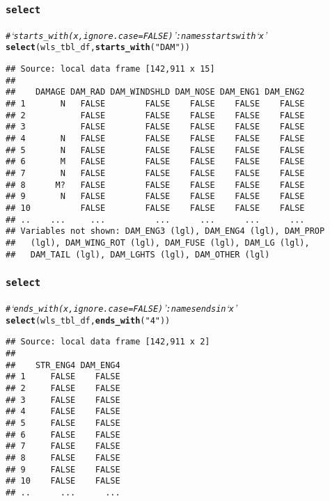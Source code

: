 \documentclass{beamer}\usepackage[]{graphicx}\usepackage[]{color}
\makeatletter
\newcommand{\hlstr}[1]{\textcolor[rgb]{0.192,0.494,0.8}{#1}}%
\newcommand{\hlcom}[1]{\textcolor[rgb]{0.678,0.584,0.686}{\textit{#1}}}%
\newcommand{\hlstd}[1]{\textcolor[rgb]{0.345,0.345,0.345}{#1}}%
\newcommand{\hlkwd}[1]{\textcolor[rgb]{0.737,0.353,0.396}{\textbf{#1}}}%
\newenvironment{kframe}{%
 \def\at@end@of@kframe{}%
 \ifinner\ifhmode%
  \def\at@end@of@kframe{\end{minipage}}%
  \begin{minipage}{\columnwidth}%
 \fi\fi%
 \def\FrameCommand##1{\hskip\@totalleftmargin \hskip-\fboxsep
 \colorbox{shadecolor}{##1}\hskip-\fboxsep
     \hskip-\linewidth \hskip-\@totalleftmargin \hskip\columnwidth}%
 \MakeFramed {\advance\hsize-\width
   \@totalleftmargin\z@ \linewidth\hsize
   \@setminipage}}%
 {\par\unskip\endMakeFramed%
 \at@end@of@kframe}
\newenvironment{knitrout}{}{} %
\makeatother
\begin{document}
\begin{frame}[fragile]
  \frametitle{{\tt select}}
\begin{knitrout}\footnotesize
{}\color{fgcolor}\begin{kframe}
\begin{alltt}
\hlcom{# ‘starts_with(x, ignore.case = FALSE)’: names starts with ‘x’}
\hlkwd{select}\hlstd{(wls_tbl_df,} \hlkwd{starts_with}\hlstd{(}\hlstr{"DAM"}\hlstd{))}
\end{alltt}
\begin{verbatim}
## Source: local data frame [142,911 x 15]
## 
##    DAMAGE DAM_RAD DAM_WINDSHLD DAM_NOSE DAM_ENG1 DAM_ENG2
## 1       N   FALSE        FALSE    FALSE    FALSE    FALSE
## 2           FALSE        FALSE    FALSE    FALSE    FALSE
## 3           FALSE        FALSE    FALSE    FALSE    FALSE
## 4       N   FALSE        FALSE    FALSE    FALSE    FALSE
## 5       N   FALSE        FALSE    FALSE    FALSE    FALSE
## 6       M   FALSE        FALSE    FALSE    FALSE    FALSE
## 7       N   FALSE        FALSE    FALSE    FALSE    FALSE
## 8      M?   FALSE        FALSE    FALSE    FALSE    FALSE
## 9       N   FALSE        FALSE    FALSE    FALSE    FALSE
## 10          FALSE        FALSE    FALSE    FALSE    FALSE
## ..    ...     ...          ...      ...      ...      ...
## Variables not shown: DAM_ENG3 (lgl), DAM_ENG4 (lgl), DAM_PROP
##   (lgl), DAM_WING_ROT (lgl), DAM_FUSE (lgl), DAM_LG (lgl),
##   DAM_TAIL (lgl), DAM_LGHTS (lgl), DAM_OTHER (lgl)
\end{verbatim}
\end{kframe}
\end{knitrout}
\end{frame} 

\begin{frame}[fragile]
  \frametitle{{\tt select}}
\begin{knitrout}\footnotesize
{}\color{fgcolor}\begin{kframe}
\begin{alltt}
\hlcom{# ‘ends_with(x, ignore.case = FALSE)’: names ends in ‘x’}
\hlkwd{select}\hlstd{(wls_tbl_df,} \hlkwd{ends_with}\hlstd{(}\hlstr{"4"}\hlstd{))}
\end{alltt}
\begin{verbatim}
## Source: local data frame [142,911 x 2]
## 
##    STR_ENG4 DAM_ENG4
## 1     FALSE    FALSE
## 2     FALSE    FALSE
## 3     FALSE    FALSE
## 4     FALSE    FALSE
## 5     FALSE    FALSE
## 6     FALSE    FALSE
## 7     FALSE    FALSE
## 8     FALSE    FALSE
## 9     FALSE    FALSE
## 10    FALSE    FALSE
## ..      ...      ...
\end{verbatim}
\end{kframe}
\end{knitrout}
\end{frame} 
\end{document}
